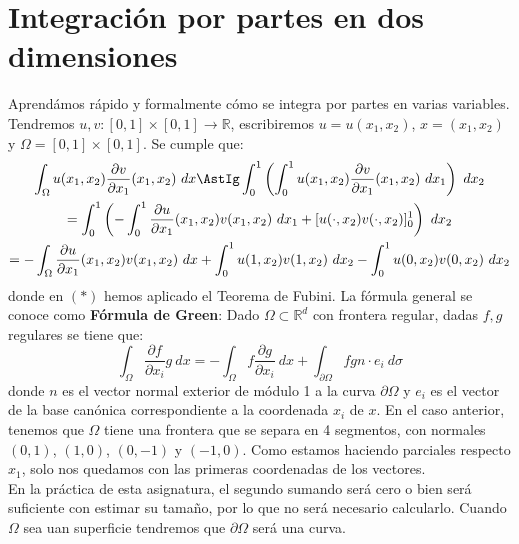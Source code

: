 \section{Integración por partes en dos dimensiones}
\noindent
Aprendámos rápido y formalmente cómo se integra por partes en varias variables. Tendremos $u,v:[0,1]\times[0,1]\to \mathbb{R}$, escribiremos $u = u(x_1,x_2)$, $x = (x_1,x_2)$ y $\Omega = [0,1]\times [0,1]$. Se cumple que:
\begin{multline*}
    \int_\Omega u(x_1,x_2)\frac{\partial v}{\partial x_1}(x_1,x_2)~dx \AstIg \int_{0}^{1} \left(\int_{0}^{1} u(x_1,x_2)\frac{\partial v}{\partial x_1}(x_1,x_2)~dx_1\right) ~dx_2 \\
                                                                      = \int_{0}^{1} \left(-\int_{0}^{1} \frac{\partial u}{\partial x_1}(x_1,x_2)v(x_1,x_2)~dx_1 + [u(\cdot ,x_2)v(\cdot ,x_2)]_0^1\right)~dx_2  \\
                                                                      = -\int_\Omega \frac{\partial u}{\partial x_1}(x_1,x_2) v(x_1,x_2)~dx + \int_{0}^{1} u(1,x_2)v(1,x_2)~dx_2 -\int_{0}^{1}u(0,x_2)v(0,x_2)~dx_2 
\end{multline*}
donde en $(\ast)$ hemos aplicado el Teorema de Fubini. La fórmula general se conoce como \textbf{Fórmula de Green}: Dado $\Omega\subset \mathbb{R}^d$ con frontera regular, dadas $f,g$ regulares se tiene que:
\begin{equation*}
    \int_\Omega \frac{\partial f}{\partial x_i}g~dx = -\int_\Omega f\frac{\partial g}{\partial x_i}~dx + \int_{\partial\Omega} fgn\cdot e_i~d\sigma
\end{equation*}
donde $n$ es el vector normal exterior de módulo 1 a la curva $\partial \Omega$ y $e_i$ es el vector de la base canónica correspondiente a la coordenada $x_i$ de $x$. En el caso anterior, tenemos que $\Omega$ tiene una frontera que se separa en 4 segmentos, con normales $(0,1)$, $(1,0)$, $(0,-1)$ y $(-1,0)$. Como estamos haciendo parciales respecto $x_1$, solo nos quedamos con las primeras coordenadas de los vectores.\\

\noindent
En la práctica de esta asignatura, el segundo sumando será cero o bien será suficiente con estimar su tamaño, por lo que no será necesario calcularlo. Cuando $\Omega$ sea uan superficie tendremos que $\partial \Omega$ será una curva.\\

